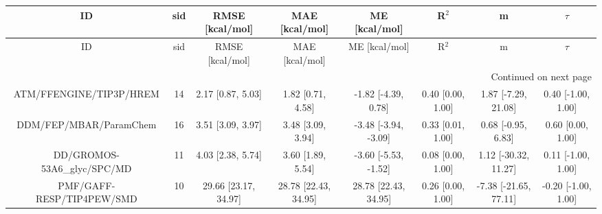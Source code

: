 \documentclass[8pt]{article}
\begin{document}
\begin{center}
\begin{footnotesize}
\begin{longtable}{|cccccccc|}
\toprule
                         ID & sid &      RMSE [kcal/mol] &       MAE [kcal/mol] &        ME [kcal/mol] &             R$^2$ &                     m &              $\tau$ \\
\midrule
\endfirsthead

\toprule
                         ID & sid &      RMSE [kcal/mol] &       MAE [kcal/mol] &        ME [kcal/mol] &             R$^2$ &                     m &              $\tau$ \\
\midrule
\endhead
\midrule
\multicolumn{8}{r}{{Continued on next page}} \\
\midrule
\endfoot

\bottomrule
\endlastfoot
    ATM/FFENGINE/TIP3P/HREM &  14 &    2.17 [0.87, 5.03] &    1.82 [0.71, 4.58] &  -1.82 [-4.39, 0.78] & 0.40 [0.00, 1.00] &   1.87 [-7.29, 21.08] &  0.40 [-1.00, 1.00] \\
     DDM/FEP/MBAR/ParamChem &  16 &    3.51 [3.09, 3.97] &    3.48 [3.09, 3.94] & -3.48 [-3.94, -3.09] & 0.33 [0.01, 1.00] &    0.68 [-0.95, 6.83] &   0.60 [0.00, 1.00] \\
DD/GROMOS-53A6\_glyc/SPC/MD &  11 &    4.03 [2.38, 5.74] &    3.60 [1.89, 5.54] & -3.60 [-5.53, -1.52] & 0.08 [0.00, 1.00] &  1.12 [-30.32, 11.27] &  0.11 [-1.00, 1.00] \\
  PMF/GAFF-RESP/TIP4PEW/SMD &  10 & 29.66 [23.17, 34.97] & 28.78 [22.43, 34.95] & 28.78 [22.43, 34.95] & 0.26 [0.00, 1.00] & -7.38 [-21.65, 77.11] & -0.20 [-1.00, 1.00] \\
\end{longtable}
\end{footnotesize}
\end{center}
\end{document}
